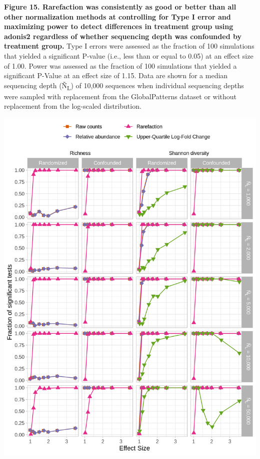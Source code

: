 \documentclass[
]{article}
\begin{document}
\textbf{Figure 15. Rarefaction was consistently as good or better than
all other normalization methods at controlling for Type I error and
maximizing power to detect differences in treatment group using adonis2
regardless of whether sequencing depth was confounded by treatment
group.} Type I errors were assessed as the fraction of 100 simulations
that yielded a significant P-value (i.e., less than or equal to 0.05) at
an effect size of 1.00. Power was assessed as the fraction of 100
simulations that yielded a significant P-Value at an effect size of
1.15. Data are shown for a median sequencing depth (Ñ\textsubscript{L})
of 10,000 sequences when individual sequencing depths were sampled with
replacement from the GlobalPatterns dataset or without replacement from
the log-scaled distribution.

\newpage

\includegraphics{figure_16.png}
\end{document}
